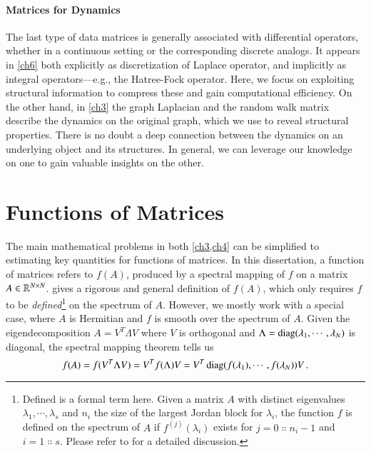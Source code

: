 \paragraph{Matrices for Dynamics}

The last type of data matrices is generally associated with differential
operators, whether in a continuous setting or the corresponding discrete
analogs. It appears in \cref{ch6} both explicitly as discretization of Laplace
operator, and implicitly as integral operators---e.g., the Hatree\hyp{}Fock
operator. Here, we focus on exploiting structural information to compress these
and gain computational efficiency. On the other hand, in \cref{ch3} the graph
Laplacian and the random walk matrix describe the dynamics on the original
graph, which we use to reveal structural properties. There is no doubt a deep
connection between the dynamics on an underlying object and its structures. In
general, we can leverage our knowledge on one to gain valuable insights on the
other.

\section{Functions of Matrices}\label{pre:fom}

The main mathematical problems in both \cref{ch3,ch4} can be simplified to
estimating key quantities for functions of matrices. In this dissertation,
a function of matrices refers to $f(A)$, produced by a spectral mapping of $f$
on a matrix $A\in\mathbb{R}^{N\mathbin{\times} N}$. \citet{higham2008functions} gives a rigorous
and general definition of $f(A)$, which only requires $f$ to be 
\emph{defined}\footnote{Defined is a formal term here. Given a matrix $A$
with distinct eigenvalues $\lambda_1,\cdots,\lambda_s$ and $n_i$ the size of
the largest Jordan block for $\lambda_i$, the function $f$ is defined on the
spectrum of $A$ if $f^{(j)}(\lambda_i)$ exists for $j = 0\Colon n_i-1$ and $i =
1\Colon s$. Please refer to \cite[Definition~1.1]{higham2008functions} for a
detailed discussion.} on the spectrum of $A$. However, we mostly work with a
special case, where $A$ is Hermitian and $f$ is smooth over the spectrum of $A$.
Given the eigendecomposition $A = V^T\Lambda V$ where $V$ is orthogonal and
$\Lambda = \operatorname{diag}(\lambda_1,\cdots,\lambda_N)$ is diagonal, the spectral mapping
theorem tells us
\begin{equation}\label{eqn:smt}
	f(A) = f(V^T\Lambda V) = V^T f(\Lambda)V = V^T\operatorname{diag}(f(\lambda_1),\cdots,f
	(\lambda_N))V\,.
\end{equation}

